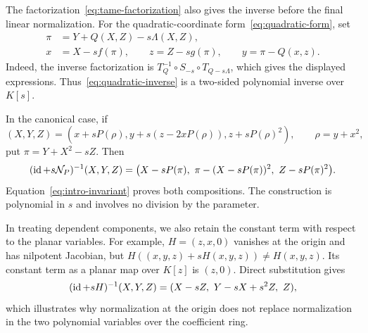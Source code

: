 The factorization~\eqref{eq:tame-factorization} also gives the inverse before the final linear normalization. For the quadratic-coordinate form~\eqref{eq:quadratic-form}, set
\begin{equation}\label{eq:quadratic-inverse}
 \begin{aligned}
 \pi&=Y+Q(X,Z)-s\Lambda(X,Z),\\
 x&=X-sf(\pi),\qquad z=Z-sg(\pi),\qquad y=\pi-Q(x,z).
 \end{aligned}
\end{equation}
Indeed, the inverse factorization is $T_Q^{-1}\circ S_{-s}\circ T_{Q-s\Lambda}$, which gives the displayed expressions. Thus~\eqref{eq:quadratic-inverse} is a two-sided polynomial inverse over $K[s]$.

In the canonical case, if
\[
 (X,Y,Z)=(x+sP(\rho),y+s(z-2xP(\rho)),z+sP(\rho)^2),\qquad \rho=y+x^2,
\]
put $\pi=Y+X^2-sZ$. Then
\begin{equation}\label{eq:canonical-inverse}
 (\operatorname{id}+s\mathcal N_P)^{-1}(X,Y,Z)
 =\bigl(X-sP(\pi),\ \pi-(X-sP(\pi))^2,\ Z-sP(\pi)^2\bigr).
\end{equation}
Equation~\eqref{eq:intro-invariant} proves both compositions. The construction is polynomial in $s$ and involves no division by the parameter.

In treating dependent components, we also retain the constant term with respect to the planar variables. For example, $H=(z,x,0)$ vanishes at the origin and has nilpotent Jacobian, but $H((x,y,z)+sH(x,y,z))\neq H(x,y,z)$. Its constant term as a planar map over $K[z]$ is $(z,0)$. Direct substitution gives
\[
 (\id+sH)^{-1}(X,Y,Z)=(X-sZ,\ Y-sX+s^2Z,\ Z),
\]
which illustrates why normalization at the origin does not replace normalization in the two polynomial variables over the coefficient ring.


